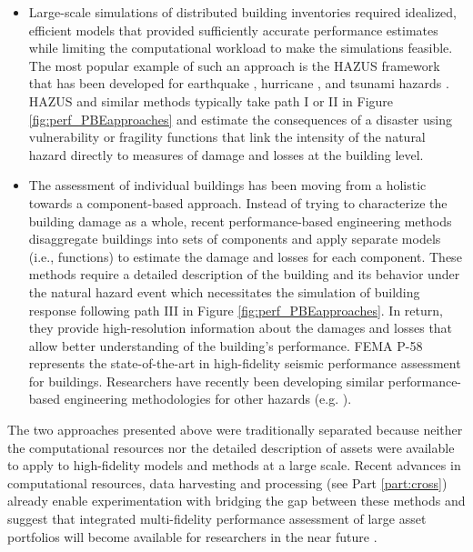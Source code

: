 \begin{itemize}
    \item Large-scale simulations of distributed building inventories required idealized, efficient models that provided sufficiently accurate performance estimates while limiting the computational workload to make the simulations feasible. The most popular example of such an approach is the HAZUS framework that has been developed for earthquake \citep{fema2018earthquaketechnical}, hurricane \citep{fema2018hurricaneuser}, and tsunami hazards \citep{fema2017tsunamitechnical}. HAZUS and similar methods typically take path I or II in Figure \ref{fig:perf_PBEapproaches} and estimate the consequences of a disaster using vulnerability or fragility functions that link the intensity of the natural hazard directly to measures of damage and losses at the building level. 
    \item The assessment of individual buildings has been moving from a holistic towards a component-based approach. Instead of trying to characterize the building damage as a whole, recent performance-based engineering methods disaggregate buildings into sets of components and apply separate models (i.e., functions) to estimate the damage and losses for each component. These methods require a detailed description of the building and its behavior under the natural hazard event which necessitates the simulation of building response following path III in Figure \ref{fig:perf_PBEapproaches}. In return, they provide high-resolution information about the damages and losses that allow better understanding of the building's performance. FEMA P-58 \citep{atc2018p-58-1} represents the state-of-the-art in high-fidelity seismic performance assessment for buildings. Researchers have recently been developing similar performance-based engineering methodologies for other hazards (e.g. \cite{barbato2013performancebased, ouyang2020performance, attary2017performancebased}).
\end{itemize}

The two approaches presented above were traditionally separated because neither the computational resources nor the detailed description of assets were available to apply to high-fidelity models and methods at a large scale. Recent advances in computational resources, data harvesting and processing (see Part \ref{part:cross}) already enable experimentation with bridging the gap between these methods and suggest that integrated multi-fidelity performance assessment of large asset portfolios will become available for researchers in the near future \citep{deierlein2020cloud}.

